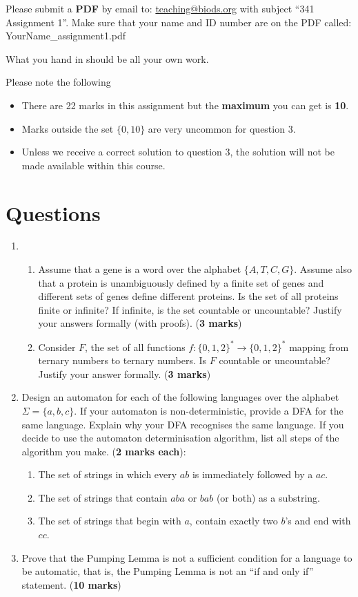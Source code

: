 \documentclass{article}
\begin{document}

Please submit a {\bf PDF} by email to: \href{mailto:teaching@biods.org}{teaching@biods.org} with subject ``341 Assignment 1''. Make sure that your name and ID number are on the PDF called: YourName\_assignment1.pdf

What you hand in should be all your own work.

Please note the following
\begin{itemize}
\item There are 22 marks in this assignment but the \textbf{maximum} you can get is \textbf{10}.
\item Marks outside the set $\{0, 10\}$ are very uncommon for question 3.
\item Unless we receive a correct solution to question 3, the solution will not be made available within this course.
\end{itemize}

\section*{Questions}
\begin{enumerate}
\item
\begin{enumerate}
\item Assume that a gene is a word over the alphabet $\{A, T, C, G\}$.
	Assume also that a protein is unambiguously defined by a finite set of genes and different sets of genes define different proteins.
	Is the set of all proteins finite or infinite?
	If infinite, is the set countable or uncountable?
	Justify your answers formally (with proofs). (\textbf{3 marks})
\item Consider $F$, the set of all functions $f: \{0,1,2\}^* \to \{0,1,2\}^*$ mapping from ternary numbers to ternary numbers.
	Is $F$ countable or uncountable?
	Justify your answer formally. (\textbf{3 marks})
\end{enumerate}

\item Design an automaton for each of the following languages over the alphabet $\Sigma = \{a, b, c\}$.
	If your automaton is non-deterministic, provide a DFA for the same language.
	Explain why your DFA recognises the same language.
	If you decide to use the automaton determinisation algorithm, list all steps of the algorithm you make. (\textbf{2 marks each}):
	\begin{enumerate}
	  \item The set of strings in which every $ab$ is immediately followed by a $ac$.
	  \item The set of strings that contain $aba$ or $bab$ (or both) as a substring.
	  \item The set of strings that begin with $a$, contain exactly two $b$'s and end with $cc$.
	\end{enumerate}

\item Prove that the Pumping Lemma is not a sufficient condition for a language to be automatic, that is, the Pumping Lemma is not an ``if and only if'' statement. (\textbf{10 marks})
\end{enumerate}
\end{document}
